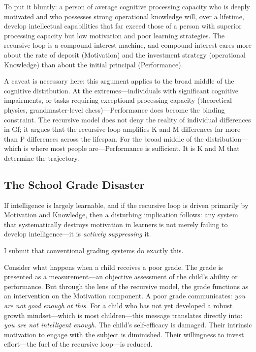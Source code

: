 \documentclass[12pt,a4paper]{article}
\begin{document}
To put it bluntly: a person of average cognitive processing capacity who is deeply motivated and who possesses strong operational knowledge will, over a lifetime, develop intellectual capabilities that far exceed those of a person with superior processing capacity but low motivation and poor learning strategies. The recursive loop is a compound interest machine, and compound interest cares more about the rate of deposit (Motivation) and the investment strategy (operational Knowledge) than about the initial principal (Performance).

A caveat is necessary here: this argument applies to the broad middle of the cognitive distribution. At the extremes---\hspace{0pt}individuals with significant cognitive impairments, or tasks requiring exceptional processing capacity (theoretical physics, grandmaster-level chess)---\hspace{0pt}Performance does become the binding constraint. The recursive model does not deny the reality of individual differences in Gf; it argues that the recursive loop amplifies K and M differences far more than P differences across the lifespan. For the broad middle of the distribution---\hspace{0pt}which is where most people are---\hspace{0pt}Performance is sufficient. It is K and M that determine the trajectory.

\subsection{The School Grade Disaster}

If intelligence is largely learnable, and if the recursive loop is driven primarily by Motivation and Knowledge, then a disturbing implication follows: any system that systematically destroys motivation in learners is not merely failing to develop intelligence---\hspace{0pt}it is \emph{actively suppressing} it.

I submit that conventional grading systems do exactly this.

Consider what happens when a child receives a poor grade. The grade is presented as a measurement---\hspace{0pt}an objective assessment of the child's ability or performance. But through the lens of the recursive model, the grade functions as an intervention on the Motivation component. A poor grade communicates: \emph{you are not good enough at this.} For a child who has not yet developed a robust growth mindset---\hspace{0pt}which is most children---\hspace{0pt}this message translates directly into: \emph{you are not intelligent enough.} The child's self-efficacy is damaged. Their intrinsic motivation to engage with the subject is diminished. Their willingness to invest effort---\hspace{0pt}the fuel of the recursive loop---\hspace{0pt}is reduced.
\end{document}
